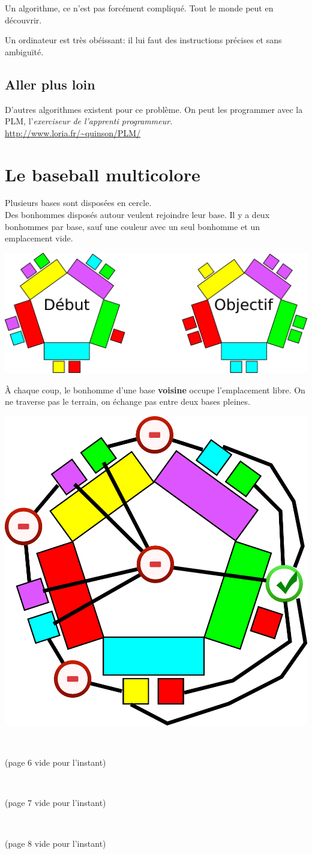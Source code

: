 \documentclass[a7paper,pagesize,DIV=14,10pt]{scrbook}
\begin{document}
Un algorithme, ce n'est pas forcément compliqué. Tout le monde peut en découvrir.

\smallskip
Un ordinateur est très obéissant: il lui faut des instructions
précises et sans ambiguïté.

\vspace{-.5\baselineskip}
\subsection*{Aller plus loin}
\vspace{-.5\baselineskip}
D'autres algorithmes existent pour ce problème. On peut les programmer
avec la PLM, l'\textit{exerciseur de l'apprenti programmeur}.\\
{\small\color{blue}\url{http://www.loria.fr/~quinson/PLM/}}

\newpage
\section*{Le baseball multicolore}

Plusieurs bases sont disposées en cercle.\\
Des bonhommes disposés autour veulent rejoindre leur base. 
Il y a deux bonhommes par base, sauf une couleur avec un seul bonhomme et un emplacement vide.

\smallskip
\centerline{\includegraphics[width=.7\linewidth]{img/baseball_but-du-jeu.pdf}}

À chaque coup, le bonhomme d'une base \textbf{voisine} occupe l'emplacement
libre. On ne traverse pas le terrain, on échange pas entre deux bases pleines.

\centerline{\includegraphics[width=.4\linewidth]{img/baseball_un-coup.pdf}}

\newpage ~\vfill \centerline{(page 6 vide pour l'instant)} \vfill
\newpage ~\vfill \centerline{(page 7 vide pour l'instant)} \vfill
\newpage ~\vfill \centerline{(page 8 vide pour l'instant)} \vfill
\end{document}
